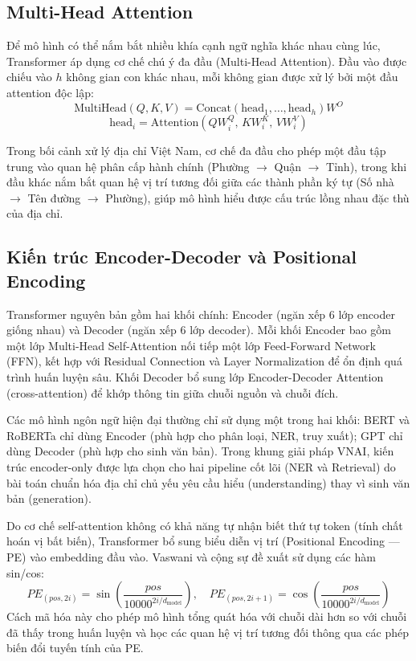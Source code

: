 \subsection{Multi-Head Attention}

Để mô hình có thể nắm bắt nhiều khía cạnh ngữ nghĩa khác nhau cùng lúc, Transformer áp dụng cơ chế chú ý đa đầu (Multi-Head Attention). Đầu vào được chiếu vào $h$ không gian con khác nhau, mỗi không gian được xử lý bởi một đầu attention độc lập:
\begin{equation}
\mathrm{MultiHead}(Q,K,V) = \mathrm{Concat}(\mathrm{head}_1, \dots, \mathrm{head}_h) W^O
\label{eq:multihead}
\end{equation}
\begin{equation}
\mathrm{head}_i = \mathrm{Attention}(QW_i^Q,\, KW_i^K,\, VW_i^V)
\label{eq:head-i}
\end{equation}

Trong bối cảnh xử lý địa chỉ Việt Nam, cơ chế đa đầu cho phép một đầu tập trung vào quan hệ phân cấp hành chính (Phường $\to$ Quận $\to$ Tỉnh), trong khi đầu khác nắm bắt quan hệ vị trí tương đối giữa các thành phần ký tự (Số nhà $\to$ Tên đường $\to$ Phường), giúp mô hình hiểu được cấu trúc lồng nhau đặc thù của địa chỉ.

\subsection{Kiến trúc Encoder-Decoder và Positional Encoding}

Transformer nguyên bản gồm hai khối chính: Encoder (ngăn xếp 6 lớp encoder giống nhau) và Decoder (ngăn xếp 6 lớp decoder). Mỗi khối Encoder bao gồm một lớp Multi-Head Self-Attention nối tiếp một lớp Feed-Forward Network (FFN), kết hợp với Residual Connection và Layer Normalization để ổn định quá trình huấn luyện sâu. Khối Decoder bổ sung lớp Encoder-Decoder Attention (cross-attention) để khớp thông tin giữa chuỗi nguồn và chuỗi đích.

Các mô hình ngôn ngữ hiện đại thường chỉ sử dụng một trong hai khối: BERT \cite{devlin2019} và RoBERTa \cite{Liu2019} chỉ dùng Encoder (phù hợp cho phân loại, NER, truy xuất); GPT chỉ dùng Decoder (phù hợp cho sinh văn bản). Trong khung giải pháp VNAI, kiến trúc encoder-only được lựa chọn cho hai pipeline cốt lõi (NER và Retrieval) do bài toán chuẩn hóa địa chỉ chủ yếu yêu cầu hiểu (understanding) thay vì sinh văn bản (generation).

Do cơ chế self-attention không có khả năng tự nhận biết thứ tự token (tính chất hoán vị bất biến), Transformer bổ sung biểu diễn vị trí (Positional Encoding --- PE) vào embedding đầu vào. Vaswani và cộng sự đề xuất sử dụng các hàm sin/cos:
\begin{equation}
PE_{(pos, 2i)} = \sin\!\left(\frac{pos}{10000^{2i/d_{\text{model}}}}\right),\quad
PE_{(pos, 2i+1)} = \cos\!\left(\frac{pos}{10000^{2i/d_{\text{model}}}}\right)
\label{eq:posenc}
\end{equation}
Cách mã hóa này cho phép mô hình tổng quát hóa với chuỗi dài hơn so với chuỗi đã thấy trong huấn luyện và học các quan hệ vị trí tương đối thông qua các phép biến đổi tuyến tính của PE.

